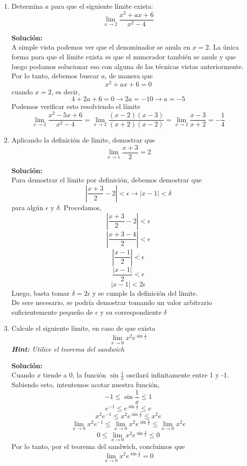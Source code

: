 \documentclass[12pt]{article}
\newenvironment{solucion}
{\begin{mdframed}[backgroundcolor=black!10]
		{\bf Solución:}\\
	}
	{
	\end{mdframed}
}
\newenvironment{preguntas}
{\begin{enumerate}\itemsep12pt
	}
	{
	\end{enumerate}
}
\newcommand{\ra}{\rightarrow}
\begin{document}
\begin{preguntas}
\begin{solucion}
\begin{enumerate}[a)]
$$\dfrac{1}{2}-\dfrac{1}{|2|} = 0$$
\end{enumerate}
\end{solucion}
\item Determina $a$ para que el siguiente límite exista:
$$ \lim\limits_{x \ra 2} \dfrac{x^2+ax+6}{x^2-4} $$
\begin{solucion}
A simple vista podemos ver que el denominador se anula en $x=2$. La única forma para que el límite exista es que el numerador también se anule y que luego podamos solucionar eso con alguna de las técnicas vistas anteriormente.\\
Por lo tanto, debemos buscar $a$, de manera que
$$x^2+ax+6 = 0$$
cuando $x=2$, es decir,
$$4+2a+6 = 0 \ra 2a = -10 \ra a = -5$$
Podemos verificar esto resolviendo el límite
$$ \lim\limits_{x \ra 2} \dfrac{x^2-5x+6}{x^2-4}
= \lim\limits_{x \ra 2} \dfrac{(x-2)(x-3)}{(x+2)(x-2)}
= \lim\limits_{x \ra 2} \dfrac{x-3}{x+2}
= -\dfrac{1}{4} $$
\end{solucion}
\item Aplicando la definición de límite, demostrar que
$$\lim\limits_{x \ra 1} \dfrac{x+3}{2} = 2$$
\begin{solucion}
Para demostrar el límite por definición, debemos demostrar que
$$\left| \dfrac{x+3}{2} - 2 \right| < \epsilon \ra |x-1| < \delta$$
para algún $\epsilon$ y $\delta$. Procedamos,
$$\left| \dfrac{x+3}{2} - 2 \right| < \epsilon$$
$$\left| \dfrac{x+3-4}{2} \right| < \epsilon$$
$$\left| \dfrac{x-1}{2} \right| < \epsilon$$
$$ \dfrac{|x-1|}{2} < \epsilon$$
$$ |x-1| < 2\epsilon$$
Luego, basta tomar $\delta = 2 \epsilon$ y se cumple la definición del límite. \\
De sere necesario, se podría demostrar tomando un valor arbitrario suficientemente pequeño de $\epsilon$ y su correspondiente $\delta$
\end{solucion}
\item Calcule el siguiente límite, en caso de que exista
$$ \lim\limits_{x \ra 0} x^2e^{\sin{\frac{1}{x}}} $$
\textit{\textbf{Hint:} Utilice el teorema del sandwich}
\begin{solucion}

Cuando $x$ tiende a $0$, la función $\sin \frac{1}{x}$ oscilará infinitamente entre 1 y -1. Sabiendo esto, intentemos acotar nuestra función,
$$ -1 \leq \sin \dfrac{1}{x} \leq 1$$
$$ e^{-1} \leq e^{\sin \frac{1}{x}} \leq e$$
$$ x^2e^{-1} \leq x^2e^{\sin \frac{1}{x}} \leq x^2e$$
$$ \lim\limits_{x \ra 0} x^2e^{-1} \leq 
\lim\limits_{x \ra 0} x^2e^{\sin \frac{1}{x}} \leq
\lim\limits_{x \ra 0} x^2e$$
$$0 \leq \lim\limits_{x \ra 0} x^2e^{\sin \frac{1}{x}} \leq 0$$
Por lo tanto, por el teorema del sandwich, concluimos que
$$ \lim\limits_{x \ra 0} x^2e^{\sin{\frac{1}{x}}} = 0 $$
\end{solucion}
\end{preguntas}
\end{document}
